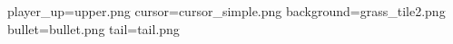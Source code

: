 player_up=upper.png
cursor=cursor_simple.png
background=grass_tile2.png
bullet=bullet.png
tail=tail.png
